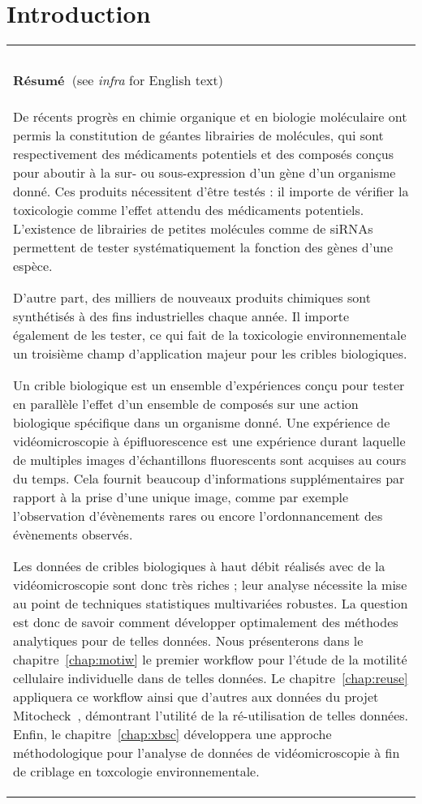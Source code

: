 \chapter{Introduction}
\begin{table}[!ht]
\begin{tabular}{|l|}
\hline
~\\

\textbf{Résumé~}(see \textit{infra} for English text)\\
\parbox{15cm}{De récents progrès en chimie organique et en biologie moléculaire ont permis la constitution de géantes librairies de molécules, qui sont respectivement des médicaments potentiels et des composés conçus pour aboutir à la sur- ou sous-expression d'un gène d'un organisme donné. Ces produits nécessitent d'être testés : il importe de vérifier la toxicologie comme l'effet attendu des médicaments potentiels. L'existence de librairies de petites molécules comme de siRNAs permettent de tester systématiquement la fonction des gènes d'une espèce. 

D'autre part, des milliers de nouveaux produits chimiques sont synthétisés à des fins industrielles chaque année. Il importe également de les tester, ce qui fait de la toxicologie environnementale un troisième champ d'application majeur pour les cribles biologiques.

Un crible biologique est un ensemble d'expériences conçu pour tester en parallèle l'effet d'un ensemble de composés sur une action biologique spécifique dans un organisme donné. Une expérience de vidéomicroscopie à épifluorescence est une expérience durant laquelle de multiples images d'échantillons fluorescents sont acquises au cours du temps. Cela fournit beaucoup d'informations supplémentaires par rapport à la prise d'une unique image, comme par exemple l'observation d'évènements rares ou encore l'ordonnancement des évènements observés.

Les données de cribles biologiques à haut débit réalisés avec de la vidéomicroscopie sont donc très riches ; leur analyse nécessite la mise au point de techniques statistiques multivariées robustes. La question est donc de savoir comment développer optimalement des méthodes analytiques pour de telles données. Nous présenterons dans le chapitre~\ref{chap:motiw} le premier workflow pour l'étude de la motilité cellulaire individuelle dans de telles données. Le chapitre~\ref{chap:reuse} appliquera ce workflow ainsi que d'autres aux données du projet Mitocheck~\cite{pmid20360735}, démontrant l'utilité de la ré-utilisation de telles données. Enfin, le chapitre~\ref{chap:xbsc} développera une approche méthodologique pour l'analyse de données de vidéomicroscopie à fin de criblage en toxcologie environnementale.}\\
~\\
\hline
\end{tabular}
\end{table}
\clearpage

